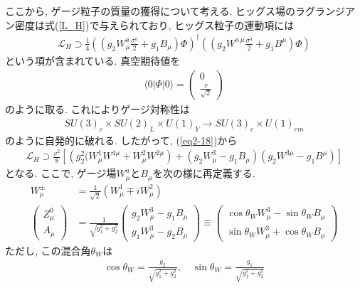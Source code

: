ここから, ゲージ粒子の質量の獲得について考える.
ヒッグス場のラグランジアン密度は式(\ref{L_H})で与えられており, ヒッグス粒子の運動項には
\begin{align}
  \mathcal{L}_H \supset \frac{1}{4}\left((g_2W^a_\mu\frac{\sigma^a}{2}+g_1B_\mu)\Phi\right)^\dagger \left((g_2W^{a\,\mu}\frac{\sigma^a}{2}+g_1B^\mu)\Phi\right)\label{eq2-18}
\end{align}
という項が含まれている.
真空期待値を
\begin{align}
  \langle 0 |\Phi |0\rangle = \left(\begin{array}{c}
      0 \\
      \frac{v}{\sqrt{2}}
      \end{array}\right)
\end{align}
のように取る.
これによりゲージ対称性は
\begin{align}
  SU(3)_c\times SU(2)_L\times U(1)_Y \rightarrow SU(3)_c\times U(1)_{em}
\end{align}
のように自発的に破れる.
したがって, (\ref{eq2-18})から
\begin{align}
  \mathcal{L}_H \supset \frac{v^2}{8}\left[\left(g_2^2(W^1_\mu  W^{1\mu}+W^2_\mu  W^{2\mu}\right)+ (g_2W_\mu^3 -g_1B_\mu)(g_2W^{3\mu}-g_1 B^{\mu})\right] \label{2-21}
\end{align}
となる.
ここで, ゲージ場$W_\mu^a$と$B_\mu$を次の様に再定義する.
\begin{align}
  W_\mu^\pm &= \frac{1}{\sqrt{2}}(W_\mu ^1 \mp i W_\mu^2)\\
  \left(\begin{array}{c}
      Z_\mu^0 \\
      A_\mu
      \end{array}\right)&=\frac{1}{\sqrt{g_1^2+g_2^2}}\left(\begin{array}{c}
      g_2 W_\mu^3-g_1 B_\mu \\
      g_1 W_\mu^3-g_2 B_\mu 
    \end{array}\right)
    \equiv \left(\begin{array}{cc}
        \cos\theta_W W_\mu^3 - \sin\theta_W B_\mu \\
        \sin\theta_W W_\mu^3 + \cos\theta_W B_\mu
      \end{array}
    \right)\label{eq2-22}
\end{align}
ただし, この混合角$\theta_W$は
\begin{align}
  \cos\theta_W = \frac{g_2}{\sqrt{g_1^2 + g_2^2}},\quad \sin\theta_W = \frac{g_1}{\sqrt{g_1^2 + g_2^2}}\nonumber
\end{align}
